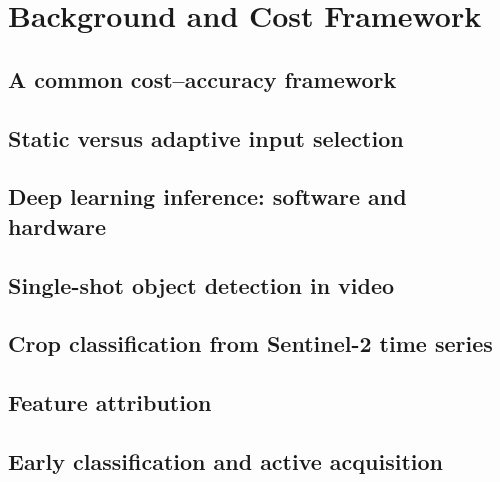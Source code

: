\chapter{Background and Cost Framework}
\label{ch:background}

\section{A common cost--accuracy framework}
\label{sec:bg:cost}

\section{Static versus adaptive input selection}
\label{sec:bg:static-adaptive}

\section{Deep learning inference: software and hardware}
\label{sec:bg:inference}

\section{Single-shot object detection in video}
\label{sec:bg:detection}

\section{Crop classification from Sentinel-2 time series}
\label{sec:bg:s2}

\section{Feature attribution}
\label{sec:bg:attribution}

\section{Early classification and active acquisition}
\label{sec:bg:early}
